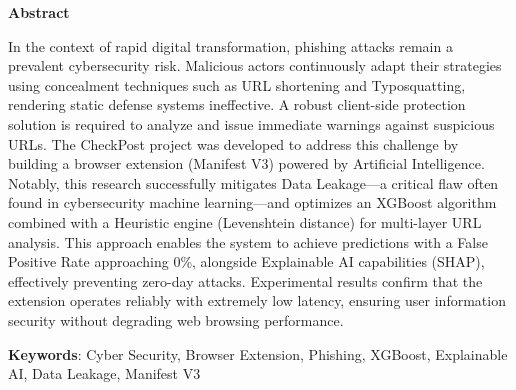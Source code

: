 \begin{center}
\textbf{\large{Abstract}	}
\end{center}

\begin{small}

In the context of rapid digital transformation, phishing attacks remain a prevalent cybersecurity risk. Malicious actors continuously adapt their strategies using concealment techniques such as URL shortening and Typosquatting, rendering static defense systems ineffective. A robust client-side protection solution is required to analyze and issue immediate warnings against suspicious URLs. The CheckPost project was developed to address this challenge by building a browser extension (Manifest V3) powered by Artificial Intelligence. Notably, this research successfully mitigates Data Leakage—a critical flaw often found in cybersecurity machine learning—and optimizes an XGBoost algorithm combined with a Heuristic engine (Levenshtein distance) for multi-layer URL analysis. This approach enables the system to achieve predictions with a False Positive Rate approaching 0\%, alongside Explainable AI capabilities (SHAP), effectively preventing zero-day attacks. Experimental results confirm that the extension operates reliably with extremely low latency, ensuring user information security without degrading web browsing performance.

\vspace*{1cm}
\textbf{Keywords}: Cyber Security, Browser Extension, Phishing, XGBoost, Explainable AI, Data Leakage, Manifest V3
\end{small}